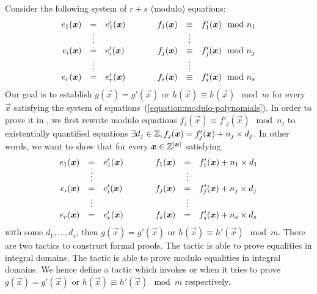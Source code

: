 
Consider the following system of $r + s$ (modulo) equations:
\begin{equation}
  \label{equation:modulo-polynomials}
  \begin{array}{rclcrcl}
    e_1 (\vec{x}) & = & e'_1 (\vec{x}) 
    & \hspace{.05\textwidth} &
    f_1 (\vec{x}) & \equiv & f'_1 (\vec{x}) \mod n_1\\
    & \vdots & & & & \vdots \\
    e_i (\vec{x}) & = & e'_i (\vec{x}) & &
    f_j (\vec{x}) & \equiv & f'_j (\vec{x}) \mod n_j\\
    & \vdots & & & & \vdots \\
    e_r (\vec{x}) & = & e'_r (\vec{x}) & &
    f_s (\vec{x}) & \equiv & f'_s (\vec{x}) \mod n_s
  \end{array}
\end{equation}
Our goal is to establish $g (\vec{x}) = g' (\vec{x})$ or $h (\vec{x})
\equiv h (\vec{x}) \mod m$ for every $\vec{x}$ satisfying the system
of equations~(\ref{equation:modulo-polynomials}). In order to prove it
in \coq, we first rewrite modulo equations $f_j (\vec{x}) \equiv f'_j
(\vec{x}) \mod n_j$ to existentially quantified equations $\exists d_j
\in \bbfZ, f_j (\vec{x}) = f'_j (\vec{x}) + n_j \times d_j$. In other
words, we want to show that for every $\vec{x} \in \bbfZ^{|\vec{x}|}$
satisfying 
\begin{equation}
  \label{equation:polynomials}
  \begin{array}{rclcrcl}
    e_1 (\vec{x}) & = & e'_1 (\vec{x}) 
    & \hspace{.05\textwidth} &
    f_1 (\vec{x}) & = & f'_1 (\vec{x}) + n_1 \times d_1 \\
    & \vdots & & & & \vdots \\
    e_i (\vec{x}) & = & e'_i (\vec{x}) & &
    f_j (\vec{x}) & = & f'_j (\vec{x}) + n_j \times d_j \\
    & \vdots & & & & \vdots \\
    e_r (\vec{x}) & = & e'_r (\vec{x}) & &
    f_s (\vec{x}) & = & f'_s (\vec{x}) + n_s \times d_s
  \end{array}
\end{equation}
with some $d_1, \ldots, d_s$, then $g (\vec{x}) = g' (\vec{x})$ or $h
(\vec{x}) \equiv h' (\vec{x}) \mod m$. There are two \coq tactics to
construct formal proofs. The tactic  is able to prove
equalities in integral domains. The tactic  is able
to prove modulo equalities in integral domains. We hence define a
\coq tactic which invokes  or  when
it tries to prove $g (\vec{x}) = g' (\vec{x})$ or $h (\vec{x}) \equiv
h' (\vec{x}) \mod m$ respectively.

